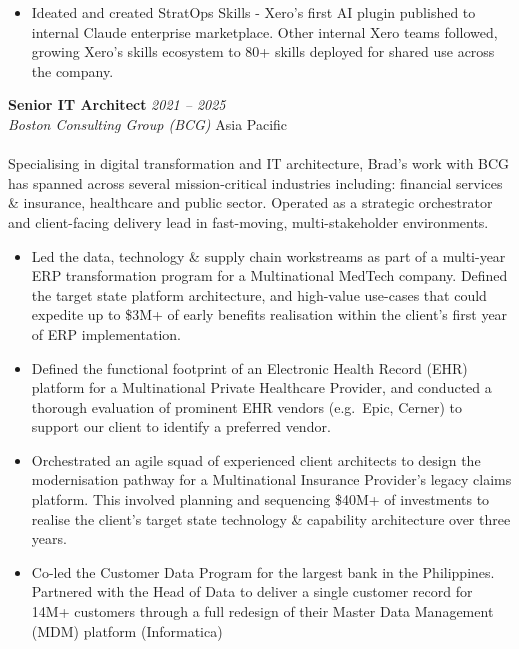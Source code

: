 \documentclass[margin]{res}
\begin{document}
\begin{resume}
\begin{itemize}
            \item Ideated and created StratOps Skills - Xero's first AI plugin published to internal Claude enterprise marketplace. Other internal Xero teams followed, growing Xero's skills ecosystem to 80+ skills deployed for shared use across the company.

        \end{itemize}
        \vspace{1mm}

        \textbf{Senior IT Architect} \hfill \textit{2021 -- 2025} \\
        \textit{Boston Consulting Group (BCG)} \hfill Asia Pacific\\\\
        {Specialising in digital transformation and IT architecture, Brad's work with BCG has spanned across several mission-critical industries including: financial services \& insurance, healthcare and public sector. Operated as a strategic orchestrator and client-facing delivery lead in fast-moving, multi-stakeholder environments.}

        \begin{itemize} \itemsep +1pt

            \item Led the data, technology \& supply chain workstreams as part of a multi-year ERP transformation program for a Multinational MedTech company. Defined the target state platform architecture, and high-value use-cases that could expedite up to \$3M+ of early benefits realisation within the client's first year of ERP implementation.

            \item Defined the functional footprint of an Electronic Health Record (EHR) platform for a Multinational Private Healthcare Provider, and conducted a thorough evaluation of prominent EHR vendors (e.g.\ Epic, Cerner) to support our client to identify a preferred vendor.

            \item Orchestrated an agile squad of experienced client architects to design the modernisation pathway for a Multinational Insurance Provider's legacy claims platform. This involved planning and sequencing \$40M+ of investments to realise the client's target state technology \& capability architecture over three years.

            \item Co-led the Customer Data Program for the largest bank in the Philippines. Partnered with the Head of Data to deliver a single customer record for 14M+ customers through a full redesign of their Master Data Management (MDM) platform (Informatica)
        \end{itemize}
        \vspace{1mm}


\end{resume}
\end{document}
